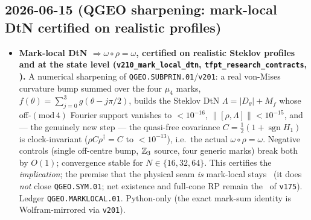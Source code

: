 \subsection*{2026-06-15 (QGEO sharpening: mark-local DtN certified on realistic profiles)}
\begin{itemize}
\item \textbf{Mark-local DtN $\Rightarrow\omega\circ\rho=\omega$, certified on realistic Steklov profiles and
  at the state level (\texttt{v210\_mark\_local\_dtn}, \texttt{tfpt\_research\_contracts}, \mO).} A numerical
  sharpening of \texttt{QGEO.SUBPRIN.01}/\texttt{v201}: a real von-Mises curvature bump summed over the four
  $\mu_4$ marks, $f(\theta)=\sum_{j=0}^3 g(\theta-j\pi/2)$, builds the Steklov DtN $\Lambda=|D_\theta|+M_f$
  whose off-$(\mathrm{mod}\,4)$ Fourier support vanishes to $<10^{-16}$, $\|[\rho,\Lambda]\|<10^{-15}$, and ---
  the genuinely new step --- the quasi-free covariance $C=\tfrac12(1+\operatorname{sgn}H_1)$ is clock-invariant
  ($\rho C\rho^\dagger=C$ to $<10^{-13}$), i.e.\ the actual $\omega\circ\rho=\omega$. Negative controls (single
  off-centre bump, $\mathbb{Z}_3$ source, four generic marks) break both by $O(1)$; convergence stable for
  $N\in\{16,32,64\}$. This certifies the \emph{implication}; the premise that the physical seam \emph{is}
  mark-local stays \mO\ (it does \emph{not} close \texttt{QGEO.SYM.01}; net existence and full-cone RP remain
  the \mE\ of \texttt{v175}). Ledger \texttt{QGEO.MARKLOCAL.01}. Python-only (the exact mark-sum identity is
  Wolfram-mirrored via \texttt{v201}).
\end{itemize}


